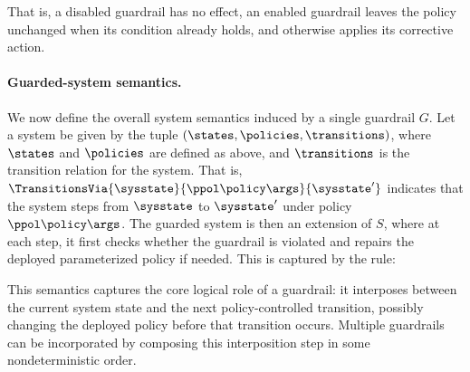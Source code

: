 That is,  a disabled guardrail has no effect, an enabled guardrail leaves the policy unchanged when its condition already holds, and otherwise applies its corrective action.


\paragraph{Guarded-system semantics.}
We now define the overall system semantics induced by a single guardrail $G$.
Let a system be given by the tuple $(\states,\policies,\transitions)$, where $\states$ and $\policies$ are defined as above, and $\transitions$ is the transition relation for the system. That is, $\TransitionsVia{\sysstate}{\ppol\policy\args}{\sysstate'}$ indicates that the system steps from $\sysstate$ to $\sysstate'$ under policy $\ppol\policy\args$.
The guarded system is then an extension of $S$, where at each step, it first checks whether the guardrail is violated and repairs the deployed parameterized policy if needed.
This is captured by the rule:
\begin{mathpar}
\end{mathpar}

This semantics captures the core logical role of a guardrail: it interposes between the current system state and the next policy-controlled transition, possibly changing the deployed policy before that transition occurs. Multiple guardrails can be incorporated  by composing this interposition step in some  nondeterministic order.

